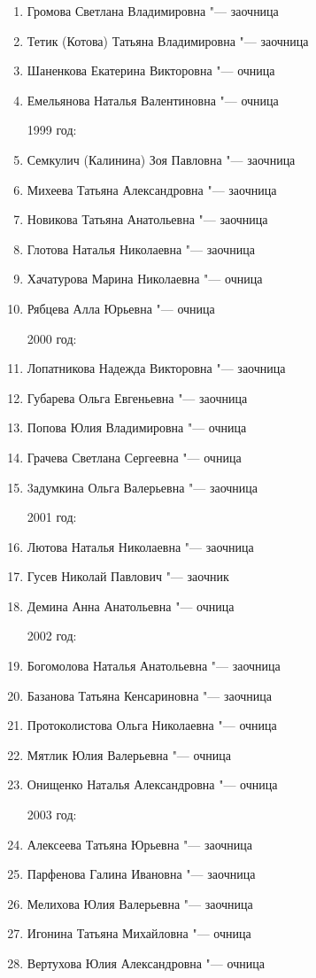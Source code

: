 \begin{enumerate}[nosep]
{1998 год:}
	\item Громова Светлана Владимировна "--- заочница
	\item Тетик (Котова) Татьяна Владимировна "--- заочница
	\item Шаненкова Екатерина Викторовна "--- очница
	\item Емельянова Наталья Валентиновна "--- очница

{1999 год:}
	\item Семкулич (Калинина) Зоя Павловна "--- заочница
	\item Михеева Татьяна Александровна "--- заочница
	\item Новикова Татьяна Анатольевна "--- заочница
	\item Глотова Наталья Николаевна "--- заочница
	\item Хачатурова Марина Николаевна "--- очница
	\item Рябцева Алла Юрьевна "--- очница

{2000 год:}
	\item Лопатникова Надежда Викторовна "--- заочница
	\item Губарева Ольга Евгеньевна "--- заочница
	\item Попова Юлия Владимировна "--- очница
	\item Грачева Светлана Сергеевна "--- очница
	\item 3адумкина Ольга Валерьевна "--- заочница

{2001 год:}
	\item Лютова Наталья Николаевна "--- заочница
	\item Гусев Николай Павлович "--- заочник
	\item Демина Анна Анатольевна "--- очница
	
{2002 год:}
	\item Богомолова Наталья Анатольевна "--- заочница
	\item Базанова Татьяна Кенсариновна "--- заочница
	\item Протоколистова Ольга Николаевна "--- очница
	\item Мятлик Юлия Валерьевна "--- очница
	\item Онищенко Наталья Александровна "--- очница

{2003 год:}
	\item Алексеева Татьяна Юрьевна "--- заочница
	\item Парфенова Галина Ивановна "--- заочница
	\item Мелихова Юлия Валерьевна "--- заочница
	\item Игонина Татьяна Михайловна "--- очница
	\item Вертухова Юлия Александровна "--- очница


\end{enumerate}
